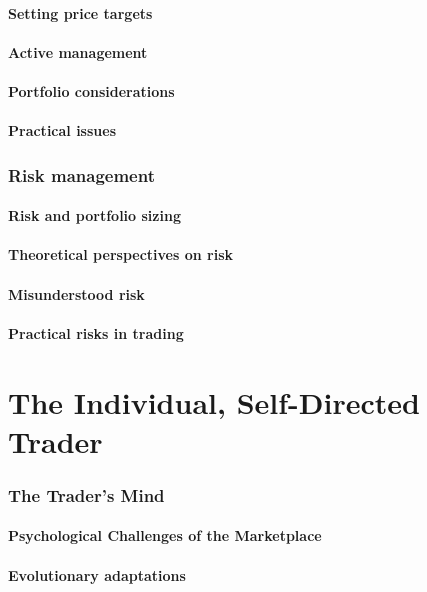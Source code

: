 \documentclass[10pt,twocolumn]{article}
\begin{document}
\subsection{Setting price targets}
\subsection{Active management}
\subsection{Portfolio considerations}
\subsection{Practical issues}

\section{Risk management}
\subsection{Risk and portfolio sizing}
\subsection{Theoretical perspectives on risk}
\subsection{Misunderstood risk}
\subsection{Practical risks in trading}

\part{The Individual, Self-Directed Trader}
\section{The Trader's Mind}
\subsection{Psychological Challenges of the Marketplace}
\subsection{Evolutionary adaptations}
\end{document}
